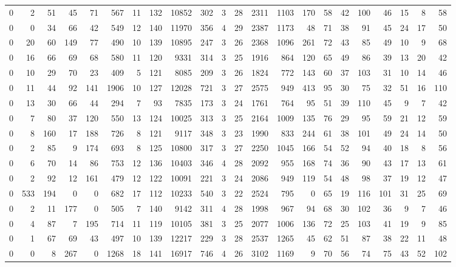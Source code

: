 {\begin{landscape}
\begin{longtable}[c]{lrrrrrrrrrrrrrrrrrrrrr}
0 & 2 & 51 & 45 & 71 & 567 & 11 & 132 & 10852 & 302 & 3 & 28 & 2311 & 1103 & 170 & 58 & 42 & 100 & 46 & 15 & 8 & 58 \\
0 & 0 & 34 & 66 & 42 & 549 & 12 & 140 & 11970 & 356 & 4 & 29 & 2387 & 1173 & 48 & 71 & 38 & 91 & 45 & 24 & 17 & 50 \\
0 & 20 & 60 & 149 & 77 & 490 & 10 & 139 & 10895 & 247 & 3 & 26 & 2368 & 1096 & 261 & 72 & 43 & 85 & 49 & 10 & 9 & 68 \\
0 & 16 & 66 & 69 & 68 & 580 & 11 & 120 & 9331 & 314 & 3 & 25 & 1916 & 864 & 120 & 65 & 49 & 86 & 39 & 13 & 20 & 42 \\
0 & 10 & 29 & 70 & 23 & 409 & 5 & 121 & 8085 & 209 & 3 & 26 & 1824 & 772 & 143 & 60 & 37 & 103 & 31 & 10 & 14 & 46 \\
0 & 11 & 44 & 92 & 141 & 1906 & 10 & 127 & 12028 & 721 & 3 & 27 & 2575 & 949 & 413 & 95 & 30 & 75 & 32 & 51 & 16 & 110 \\
0 & 13 & 30 & 66 & 44 & 294 & 7 & 93 & 7835 & 173 & 3 & 24 & 1761 & 764 & 95 & 51 & 39 & 110 & 45 & 9 & 7 & 42 \\
0 & 7 & 80 & 37 & 120 & 550 & 13 & 124 & 10025 & 313 & 3 & 25 & 2164 & 1009 & 135 & 76 & 29 & 95 & 59 & 21 & 12 & 59 \\
0 & 8 & 160 & 17 & 188 & 726 & 8 & 121 & 9117 & 348 & 3 & 23 & 1990 & 833 & 244 & 61 & 38 & 101 & 49 & 24 & 14 & 50 \\
0 & 2 & 85 & 9 & 174 & 693 & 8 & 125 & 10800 & 317 & 3 & 27 & 2250 & 1045 & 166 & 54 & 52 & 94 & 40 & 18 & 8 & 56 \\
0 & 6 & 70 & 14 & 86 & 753 & 12 & 136 & 10403 & 346 & 4 & 28 & 2092 & 955 & 168 & 74 & 36 & 90 & 43 & 17 & 13 & 61 \\
0 & 2 & 92 & 12 & 161 & 479 & 12 & 122 & 10091 & 221 & 3 & 24 & 2086 & 949 & 119 & 54 & 48 & 98 & 37 & 19 & 12 & 47 \\
0 & 533 & 194 & 0 & 0 & 682 & 17 & 112 & 10233 & 540 & 3 & 22 & 2524 & 795 & 0 & 65 & 19 & 116 & 101 & 31 & 25 & 69 \\
0 & 2 & 11 & 177 & 0 & 505 & 7 & 140 & 9142 & 311 & 4 & 28 & 1998 & 967 & 94 & 68 & 30 & 102 & 36 & 9 & 7 & 46 \\
0 & 4 & 87 & 7 & 195 & 714 & 11 & 119 & 10105 & 381 & 3 & 25 & 2077 & 1006 & 136 & 72 & 25 & 103 & 41 & 19 & 9 & 85 \\
0 & 1 & 67 & 69 & 43 & 497 & 10 & 139 & 12217 & 229 & 3 & 28 & 2537 & 1265 & 45 & 62 & 51 & 87 & 38 & 22 & 11 & 48 \\
0 & 0 & 8 & 267 & 0 & 1268 & 18 & 141 & 16917 & 746 & 4 & 26 & 3102 & 1169 & 9 & 70 & 56 & 74 & 75 & 43 & 52 & 102 \\

\end{longtable}
\end{landscape}}
